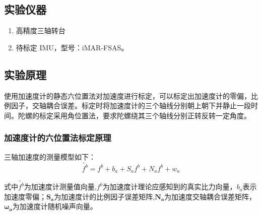 \documentclass{ctexart}
\begin{document}
\subsection{实验仪器}
\begin{enumerate}[(1)]
\item  高精度三轴转台
\item  待标定 IMU，型号：iMAR-FSAS。
\end{enumerate}

\subsection{实验原理}
使用加速度计的静态六位置法对加速度进行标定，可以标定出加速度计的零偏，比例因子，交轴耦合误差。标定时将加速度计的三个轴线分别朝上朝下并静止一段时间。陀螺的标定采用角位置法，要求陀螺绕其三个轴线分别正转反转一定角度。
\subsubsection{加速度计的六位置法标定原理}
三轴加速度的测量模型如下：
\begin{equation}
\tilde{f^{b}}=f^{b}+b_{a}+S_{a}f^{b}+N_af^b+w_{a}
\label{eq:1}
\end{equation}

式中$\tilde{f^{b}}$为加速度计测量值向量,$f^{b}$为加速度计理论应感知到的真实比力向量，$b_{a}$表示加速度零偏；$\mathbf{S_{a}}$为加速度计的比例因子误差矩阵,$\mathbf{N_{a}}$为加速度交轴耦合误差矩阵，$\pmb{\omega_{a}}$为加速度计随机噪声向量。%
\end{document}
